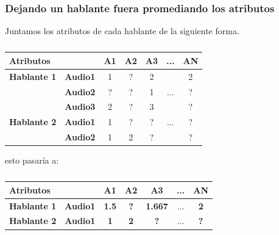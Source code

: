 \documentclass[mathserif]{beamer}%
\begin{document}
\begin{frame}
	\frametitle{Dejando un hablante fuera promediando los atributos}
	
	Juntamos los atributos de cada hablante de la siguiente forma.
	
	\begin{table}[H]
		\centering
		\resizebox{7cm}{!} {
		\begin{tabular}{|l|l|ccccc|}
			\hline
			\multicolumn{2}{|l|}{Atributos} & A1 & A2 & A3 & ... & AN \\
			\hline 
			\textbf{Hablante 1} & \textbf{Audio1} & 1 & ? & 2 & & 2\\
			& \textbf{Audio2} & ? & ? & 1 & ... & ? \\
			& \textbf{Audio3} & 2 & ? & 3 & & ? \\
			\hline
			\textbf{Hablante 2} & \textbf{Audio1} & 1 & ? & ? & ... & ? \\
			& \textbf{Audio2} & 1 & 2 & ? & & ? \\
			\hline
		\end{tabular}
		}
		\caption{}
		\label{}
	\end{table}
	
	esto pasaría a:
	
	\begin{table}[H]
		\centering
		\resizebox{7cm}{!} {
		\begin{tabular}{|l|l|ccccc|}
			\hline
			\multicolumn{2}{|l|}{Atributos} & A1 & A2 & A3 & ... & AN \\
			\hline 
			\textbf{Hablante 1} & \textbf{Audio1} & \textbf{1.5} & \textbf{?} & \textbf{1.667} & ... & \textbf{2}\\
			\hline
			\textbf{Hablante 2} & \textbf{Audio1} & \textbf{1} & \textbf{2} & \textbf{?} & ... & \textbf{?} \\
			\hline
		\end{tabular}
		}
		\caption{}
		\label{}
	\end{table}
\end{frame}
\end{document}
